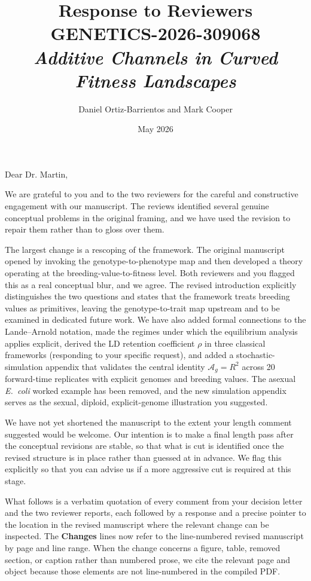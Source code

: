 \documentclass[11pt,a4paper]{article}
\title{\vspace{-2em}Response to Reviewers \\[0.4em]
\large GENETICS-2026-309068 \\[0.2em]
\textit{Additive Channels in Curved Fitness Landscapes}}
\author{Daniel Ortiz-Barrientos and Mark Cooper}
\date{May 2026}
\newcommand{\Ag}{\ensuremath{\mathcal{A}_{g}}\xspace}
\begin{document}
\maketitle

\vspace{-1em}


\noindent Dear Dr. Martin,

\medskip

We are grateful to you and to the two reviewers for the careful and constructive engagement with our manuscript. The reviews identified several genuine conceptual problems in the original framing, and we have used the revision to repair them rather than to gloss over them.

The largest change is a rescoping of the framework. The original manuscript opened by invoking the genotype-to-phenotype map and then developed a theory operating at the breeding-value-to-fitness level. Both reviewers and you flagged this as a real conceptual blur, and we agree. The revised introduction explicitly distinguishes the two questions and states that the framework treats breeding values as primitives, leaving the genotype-to-trait map upstream and to be examined in dedicated future work. We have also added formal connections to the Lande--Arnold notation, made the regimes under which the equilibrium analysis applies explicit, derived the LD retention coefficient $\rho$ in three classical frameworks (responding to your specific request), and added a stochastic-simulation appendix that validates the central identity $\Ag = R^2$ across 20 forward-time replicates with explicit genomes and breeding values. The asexual \textit{E.~coli} worked example has been removed, and the new simulation appendix serves as the sexual, diploid, explicit-genome illustration you suggested.

We have not yet shortened the manuscript to the extent your length comment suggested would be welcome. Our intention is to make a final length pass after the conceptual revisions are stable, so that what is cut is identified once the revised structure is in place rather than guessed at in advance. We flag this explicitly so that you can advise us if a more aggressive cut is required at this stage.

What follows is a verbatim quotation of every comment from your decision letter and the two reviewer reports, each followed by a response and a precise pointer to the location in the revised manuscript where the relevant change can be inspected. The \textbf{Changes} lines now refer to the line-numbered revised manuscript by page and line range. When the change concerns a figure, table, removed section, or caption rather than numbered prose, we cite the relevant page and object because those elements are not line-numbered in the compiled PDF.
\end{document}

